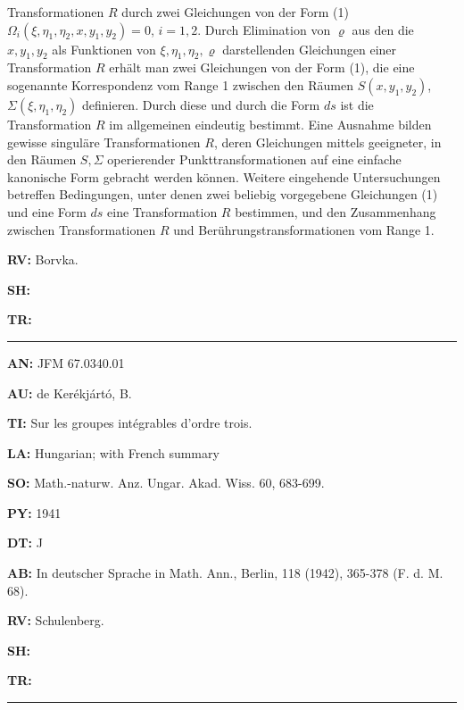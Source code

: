 {Transformationen $R$ durch
zwei Gleichungen von der Form (1)
$\varOmega_i(\xi, \eta_1, \eta_2, x, y_1, y_2)= 0$,
$i = 1, 2$.
Durch Elimination von $\varrho$ aus den die $x, y_1, y_2$
als Funktionen von $\xi, \eta_1, \eta_2, \varrho$
darstellenden Gleichungen
einer Transformation $R$ erh\"alt man zwei Gleichungen von
der Form (1), die eine sogenannte Korrespondenz vom Range 1 zwischen den
R\"aumen $S(x, y_1, y_2)$, $\varSigma (\xi, \eta_1, \eta_2)$
definieren. Durch diese und durch die Form $ds$ ist
die
Transformation $R$ im allgemeinen eindeutig bestimmt. Eine Ausnahme bilden
gewisse singul\"are
Transformationen $R$, deren Gleichungen mittels geeigneter, in den
R\"aumen $S, \varSigma$ operierender
Punkttransformationen auf eine einfache kanonische Form
gebracht werden k\"onnen. Weitere eingehende Untersuchungen betreffen
Bedingungen, unter denen
zwei beliebig vorgegebene Gleichungen (1) und eine Form $ds$ eine
Transformation $R$ bestimmen, und den Zusammenhang zwischen Transformationen $R$
und Ber\"uhrungstransformationen vom Range 1.
}
\item{\bf RV:} Bor{\uu}vka.
\item{\bf SH:}
\item{\bf TR:}

\bigskip\par\noindent\hrule\bigskip\par

\item{\bf AN:} JFM 67.0340.01
\item{\bf AU:} de Ker\'ekj\'art\'o, B.
\item{\bf TI:} Sur les groupes int\'egrables d'ordre trois.
\item{\bf LA:} Hungarian; with French summary
\item{\bf SO:} Math.-naturw. Anz. Ungar. Akad. Wiss. 60, 683-699.
\item{\bf PY:} 1941
\item{\bf DT:} J
\item{\bf AB:}{\parindent15pt
 In deutscher Sprache
in Math. Ann., Berlin, 118 (1942), 365-378 (F. d. M. 68).
}
\item{\bf RV:} Schulenberg.
\item{\bf SH:}
\item{\bf TR:}

\bigskip\par\noindent\hrule\bigskip\par


